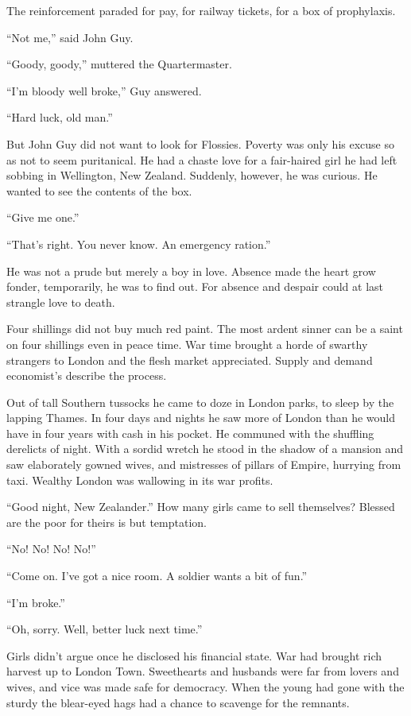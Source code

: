 The reinforcement paraded for pay, for railway tickets, for 
a box of prophylaxis.

``Not me,'' said John Guy.

``Goody, goody,'' muttered the Quartermaster.

``I'm bloody well broke,'' Guy answered.

``Hard luck, old man.''

But John Guy did not want to look for Flossies. Poverty was 
only his excuse so as not to seem puritanical. He had a chaste 
love for a fair-haired girl he had left sobbing in Wellington, 
New Zealand. Suddenly, however, he was curious. He wanted to 
see the contents of the box.

``Give me one.''

``That's right. You never know. An emergency ration.''

He was not a prude but merely a boy in love. Absence made the 
heart grow fonder, temporarily, he was to find out. For absence 
and despair could at last strangle love to death.

Four shillings did not buy much red paint. The most ardent 
sinner can be a saint on four shillings even in peace time. 
War time brought a horde of swarthy strangers to London and the 
flesh market appreciated. Supply and demand economist's describe 
the process.

Out of tall Southern tussocks he came to doze in London parks, 
to sleep by the lapping Thames. In four days and nights he saw 
more of London than he would have in four years with cash in 
his pocket. He communed with the shuffling derelicts of night. 
With a sordid wretch he stood in the shadow of a mansion and saw 
elaborately gowned wives, and mistresses of pillars of Empire, 
hurrying from taxi. Wealthy London was wallowing in its war 
profits.

``Good night, New Zealander.'' How many girls came to sell 
themselves? Blessed are the poor for theirs is but temptation.

``No! No! No! No!''

``Come on. I've got a nice room. A soldier wants a bit of fun.''

``I'm broke.''

``Oh, sorry. Well, better luck next time.''

Girls didn't argue once he disclosed his financial state. War 
had brought rich harvest up to London Town. Sweethearts and husbands 
were far from lovers and wives, and vice was made safe for democracy. 
When the young had gone with the sturdy the blear-eyed hags had a 
chance to scavenge for the remnants.

